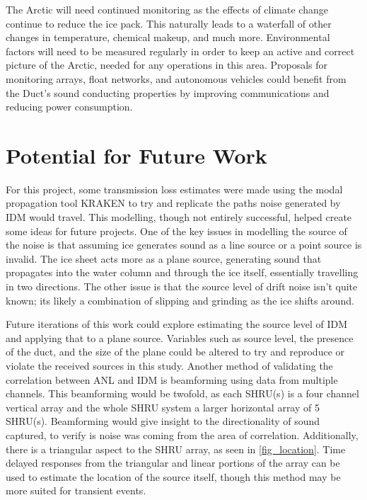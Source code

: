 The Arctic will need continued monitoring as the effects of climate change continue to reduce the ice pack. This naturally leads to a waterfall of other changes in temperature, chemical makeup, and much more. Environmental factors will need to be measured regularly in order to keep an active and correct picture of the Arctic, needed for any operations in this area. Proposals for monitoring arrays, float networks, and autonomous vehicles could benefit from the Duct's sound conducting properties by improving communications and reducing power consumption. 


\section{Potential for Future Work}


For this project, some transmission loss estimates were made using the modal propagation tool KRAKEN to try and replicate the paths noise generated by IDM would travel. This modelling, though not entirely successful, helped create some ideas for future projects. One of the key issues in modelling the source of the noise is that assuming ice generates sound as a line source or a point source is invalid. The ice sheet acts more as a plane source, generating sound that propagates into the water column and through the ice itself, essentially travelling in two directions. The other issue is that the source level of drift noise isn't quite known; its likely a combination of slipping and grinding as the ice shifts around.

Future iterations of this work could explore estimating the source level of IDM and applying that to a plane source. Variables such as source level, the presence of the duct, and the size of the plane could be altered to try and reproduce or violate the received sources in this study. Another method of validating the correlation between ANL and IDM is beamforming using data from multiple channels. This beamforming would be twofold, as each SHRU(s) is a four channel vertical array and the whole SHRU system a larger horizontal array of 5 SHRU(s). Beamforming would give insight to the directionality of sound captured, to verify is noise was coming from the area of correlation. Additionally, there is a triangular aspect to the SHRU array, as seen in \autoref{fig_location}. Time delayed responses from the triangular and linear portions of the array can be used to estimate the location of the source itself, though this method may be more suited for transient events.

